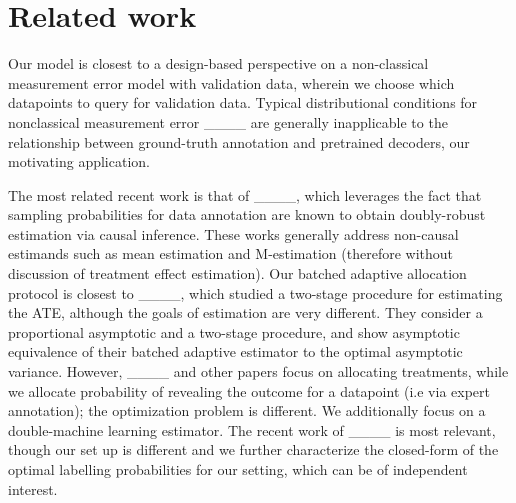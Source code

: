 \section{Related work}
Our model is closest to a design-based perspective on a non-classical measurement error model with validation data, wherein we choose which datapoints to query for validation data. Typical distributional conditions for nonclassical measurement error ____ are generally inapplicable to the relationship between ground-truth annotation and pretrained decoders, our motivating application. 

The most related recent work is that of ____, which leverages the fact that sampling probabilities for data annotation are known to obtain doubly-robust estimation via causal inference. These works generally address non-causal estimands such as mean estimation and M-estimation (therefore without discussion of treatment effect estimation). 
Our batched adaptive allocation protocol is closest to ____, which studied a two-stage procedure for estimating the ATE, although the goals of estimation are very different. They consider a proportional asymptotic and a two-stage procedure, and show asymptotic equivalence of their batched adaptive estimator to the optimal asymptotic variance. However, ____ and other papers focus on allocating treatments, while we allocate probability of revealing the outcome for a datapoint (i.e via expert annotation); the optimization problem is different. We additionally focus on a double-machine learning estimator. The recent work of ____ is most relevant, though our set up is different and we further characterize the closed-form of the optimal labelling probabilities for our setting, which can be of independent interest. 




